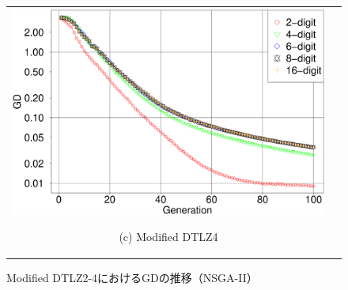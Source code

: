 \documentclass[../main/main]{subfiles}
\begin{document}
\begin{figure}[htbp]
\begin{tabular}{cc}
\begin{minipage}{0.32\hsize}
\includegraphics[width=1\linewidth]{../figures/NSGA-II/ano_DTLZ4_GD.eps}
\begin{center}
{\footnotesize (c) Modified DTLZ4}
\end{center}
\end{minipage}
\end{tabular}
\caption{Modified DTLZ2-4におけるGDの推移（NSGA-II）}
\label{fig:gd_mod_nsgaii}
\end{figure}
\end{document}

